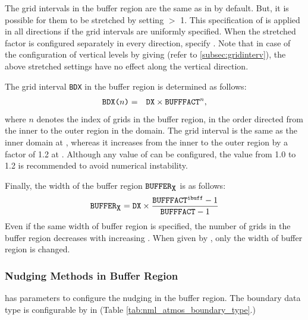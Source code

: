 The grid intervals in the buffer region are the same as  in  by default.
But, it is possible for them to be stretched by setting  $>$ 1. This specification of  is applied in all directions if the grid intervals are uniformly specified. When the stretched factor is configured separately in every direction, specify . Note that in case of the configuration of vertical levels by giving  (refer to \ref{subsec:gridinterv}), the above stretched settings have no effect along the vertical direction.

The grid interval \verb|BDX| in the buffer region is determined as follows:
\begin{eqnarray}
 \verb|BDX(|n\verb|)| &=& \verb|DX| \times \verb|BUFFFACT|^n, \nonumber
\end{eqnarray}
where $n$ denotes the index of grids in the buffer region, in the order directed from the inner to the outer region in the domain. The grid interval is the same as the inner domain at , whereas it increases from the inner to the outer region by a factor of 1.2 at .  Although any value of  can be configured, the value from 1.0 to 1.2 is recommended to avoid numerical instability.

Finally, the width of the buffer region $\verb|BUFFER|_{\verb|X|}$ is as follows:
\begin{eqnarray}
  \verb|BUFFER|_{\verb|X|} = \nmitemeq{DX} \times \frac{ \nmitemeq{BUFFFACT}^{\texttt{\detokenize{ibuff}}}-1}{ \nmitemeq{BUFFFACT}-1 }
\end{eqnarray}
Even if the same width of buffer region  is specified, the number of grids in the buffer region decreases with increasing .
When given by , only the width of buffer region is changed.



\subsubsection{Nudging Methods in Buffer Region}

 has parameters to configure the nudging in the buffer region.
The boundary data type is configurable by  in  (Table \ref{tab:nml_atmos_boundary_type}.)

